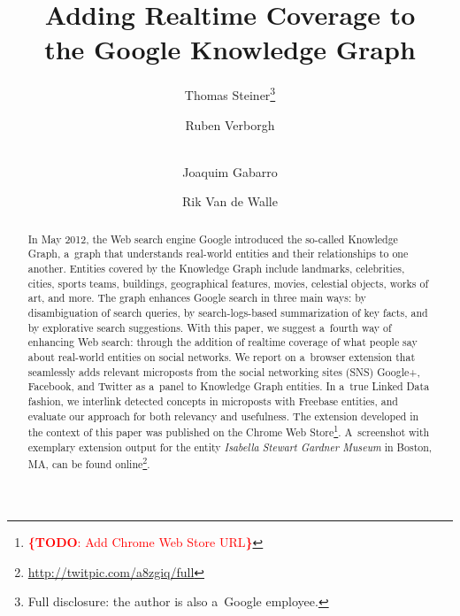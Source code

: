 \documentclass[runningheads,a4paper]{llncs}
\newcommand{\todo}[1]{\noindent\textcolor{red}{{\bf \{TODO}: #1{\bf \}}}}
\begin{document}
\title{Adding Realtime Coverage to\\the Google Knowledge Graph}

\author{Thomas Steiner\thanks{Full disclosure: the author is also a~Google employee.} \and
		Ruben Verborgh \and \\
		Joaquim Gabarro \and 
		Rik Van de Walle		
}


\maketitle
\setcounter{footnote}{0}

\begin{abstract}
In May 2012, the Web search engine Google introduced the so-called Knowledge Graph,
a~graph that understands real-world entities and their relationships to one another.
Entities covered by the Knowledge Graph include landmarks, celebrities, cities, sports
teams, buildings, geographical features, movies, celestial objects, works of art, and more.
The graph enhances Google search in three main ways:
by disambiguation of search queries,
by search-logs-based summarization of key facts,
and by explorative search suggestions.
With this paper, we suggest a~fourth way of enhancing Web search:
through the addition of realtime coverage
of what people say about real-world entities on social networks.
We report on a~browser extension that seamlessly adds relevant microposts
from the social networking sites (SNS) Google+, Facebook, and Twitter
as a~panel to Knowledge Graph entities.
In a~true Linked Data fashion, we interlink detected concepts in microposts
with Freebase entities, and evaluate our approach for both relevancy and usefulness.
The extension developed in the context of this paper was published
on the Chrome Web Store\footnote{\todo{Add Chrome Web Store URL}}.
A~screenshot with exemplary extension output for the entity
\emph{Isabella Stewart Gardner Museum} in Boston, MA,
can be found online\footnote{\url{http://twitpic.com/a8zgiq/full}}. 
\end{abstract}
\end{document}
